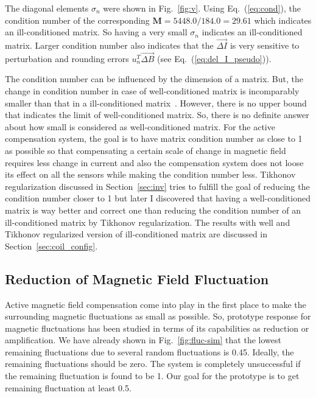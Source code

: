 The diagonal elements $\sigma_n$ were shown in Fig.~\ref{fig:v}. Using Eq.~(\ref{eq:cond}), the condition number of the corresponding $\bm{M}=5448.0/184.0=29.61$ which indicates an ill-conditioned matrix. So having a very small $\sigma_n$ indicates an ill-conditioned matrix. Larger condition number also indicates that the $\Vec{\Delta I}$ is very sensitive to perturbation and rounding errors $u_n^T \Vec{\Delta B}$ (see Eq.~(\ref{eq:del_I_pseudo})).

The condition number can be influenced by the dimension of a matrix. But, the change in condition number in case of  well-conditioned matrix is incomparably smaller than that in a ill-conditioned matrix~\cite{cond_m_size}. However, there is no upper bound that indicates the limit of well-conditioned matrix. So, there is no definite answer about how small is considered as well-conditioned matrix. For the active compensation system, the goal is to have matrix condition number as close to 1 as possible so that compensating a certain scale of change in magnetic field requires less change in current and also the compensation system does not loose its effect on all the sensors while making the condition number less. Tikhonov regularization discussed in Section~\ref{sec:inv} tries to fulfill the goal of reducing the condition number closer to 1 but later I discovered that having a well-conditioned matrix is way better and correct one than reducing the condition number of an ill-conditioned matrix by Tikhonov regularization. The results with well and Tikhonov regularized version of ill-conditioned matrix are discussed in Section~\ref{sec:coil_config}.


\subsection{Reduction of Magnetic Field Fluctuation}

Active magnetic field compensation come into play in the first place to make the surrounding magnetic fluctuations as small as possible. So, prototype response for magnetic fluctuations has been studied in terms of its capabilities as reduction or amplification. We have already shown in Fig.~\ref{fig:fluc-sim} that the lowest remaining fluctuations due to several random fluctuations is 0.45. Ideally, the remaining fluctuations should be zero. The system is completely unsuccessful if the remaining fluctuation is found to be 1. Our goal for the prototype is to get remaining fluctuation at least 0.5.


